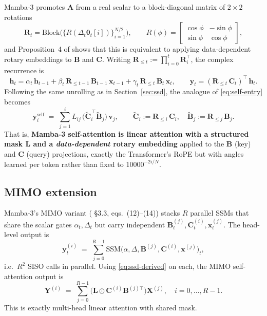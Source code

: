 \documentclass[11pt,a4paper]{article}
\begin{document}
Mamba-3 promotes $\bm{A}$ from a real scalar to a block-diagonal
matrix of $2{\times}2$ rotations
\begin{equation}\label{eq:Rdef}
  \bm{R}_t = \mathrm{Block}\bigl(\{R(\Delta_t\bm{\theta}_t[i])\}_{i=1}^{N/2}\bigr),
  \qquad
  R(\phi) = \begin{bmatrix}\cos\phi & -\sin\phi\\ \sin\phi & \cos\phi\end{bmatrix},
\end{equation}
and Proposition~4 of \cite{mamba3} shows that this is equivalent
to applying data-dependent rotary embeddings to $\bm{B}$ and $\bm{C}$.
Writing $\bm{R}_{\le t} := \prod_{i=0}^{t}\bm{R}_i^\top$, the complex
recurrence is
\begin{equation}\label{eq:complex-rec}
  \bm{h}_t = \alpha_t\,\bm{h}_{t-1}
            + \beta_t\,\bm{R}_{\le t-1}\,\bm{B}_{t-1}\,\bm{x}_{t-1}
            + \gamma_t\,\bm{R}_{\le t}\,\bm{B}_{t}\,\bm{x}_{t},
\qquad
  \bm{y}_t = (\bm{R}_{\le t}\,\bm{C}_t)^\top\,\bm{h}_t.
\end{equation}
Following the same unrolling as in Section~\ref{sec:ssd}, the
analogue of \eqref{eq:self-entry} becomes
\begin{equation}\label{eq:self-rope}
  \bm{y}_i^{\text{self}}
     \;=\; \sum_{j=1}^{i} L_{ij}\,
            \bigl(\widetilde{\bm{C}}_i^{\,\top}\widetilde{\bm{B}}_j\bigr)\,\bm{v}_j,
  \qquad
  \widetilde{\bm{C}}_i := \bm{R}_{\le i}\,\bm{C}_i,\quad
  \widetilde{\bm{B}}_j := \bm{R}_{\le j}\,\bm{B}_j.
\end{equation}
That is, \textbf{Mamba-3 self-attention is linear attention with a
structured mask $\bm{L}$ and a \emph{data-dependent} rotary embedding}
applied to the $\bm{B}$ (key) and $\bm{C}$ (query) projections,
exactly the Transformer's RoPE but with angles learned per token
rather than fixed to $10000^{-2i/N}$.

\subsection{MIMO extension}\label{sec:mimo}

Mamba-3's MIMO variant (\cite{mamba3} \S 3.3, eqs.~(12)–(14))
stacks $R$ parallel SSMs that share the scalar gates $\alpha_t,\Delta_t$
but carry independent $\bm{B}_t^{(j)},\bm{C}_t^{(i)},\bm{x}_t^{(j)}$.
The head-level output is
\begin{equation}
  \bm{y}_t^{(i)} \;=\; \sum_{j=0}^{R-1}\mathrm{SSM}\bigl(\alpha,\Delta,\bm{B}^{(j)},\bm{C}^{(i)},\bm{x}^{(j)}\bigr)_t,
\end{equation}
i.e.\ $R^2$ SISO calls in parallel. Using \eqref{eq:ssd-derived} on
each, the MIMO self-attention output is
\begin{equation}\label{eq:mimo-self}
  \bm{Y}^{(i)} \;=\; \sum_{j=0}^{R-1}
     \bigl(\bm{L}\odot \bm{C}^{(i)}\bm{B}^{(j)\top}\bigr)\bm{X}^{(j)},
  \quad i=0,\dots,R-1.
\end{equation}
This is exactly multi-head linear attention with shared mask.
\end{document}
